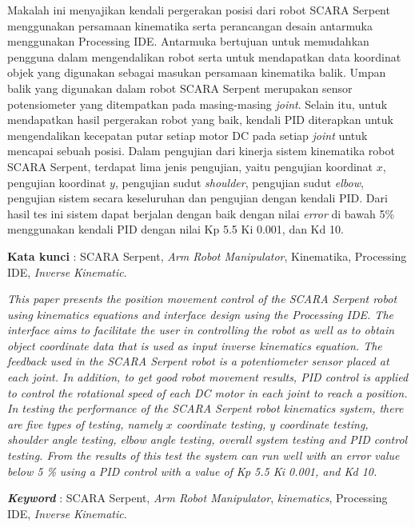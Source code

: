 \documentclass{DTEDI_KP}
\begin{document}
\tableofcontents
{}
\listoftables
{}
\listoffigures
{}

\begin{abstractind}
	Makalah ini menyajikan kendali pergerakan posisi dari robot SCARA Serpent menggunakan persamaan kinematika serta perancangan desain antarmuka menggunakan Processing IDE. Antarmuka bertujuan untuk memudahkan pengguna dalam mengendalikan robot serta untuk mendapatkan data koordinat objek yang digunakan sebagai masukan persamaan kinematika balik. Umpan balik yang digunakan dalam robot SCARA Serpent merupakan sensor potensiometer yang ditempatkan pada masing-masing \textit{joint}. Selain itu, untuk mendapatkan hasil pergerakan robot yang baik, kendali PID diterapkan untuk mengendalikan kecepatan putar setiap motor DC pada setiap \textit{joint} untuk mencapai sebuah posisi. Dalam pengujian dari kinerja sistem kinematika robot SCARA Serpent, terdapat lima jenis pengujian, yaitu pengujian koordinat $x$, pengujian koordinat $y$, pengujian sudut \textit{shoulder}, pengujian sudut \textit{elbow}, pengujian sistem secara keseluruhan dan pengujian dengan kendali PID. Dari hasil tes ini sistem dapat berjalan dengan baik dengan nilai \textit{error} di bawah 5\% menggunakan kendali PID dengan nilai Kp 5.5 Ki 0.001, dan Kd 10.
	
	
	\textbf{Kata kunci }: SCARA Serpent, \textit{Arm Robot Manipulator}, Kinematika, Processing IDE, \textit{Inverse Kinematic}.
\end{abstractind}

\begin{abstracteng}
	\textit{This paper presents the position movement control of the SCARA Serpent robot using kinematics equations and interface design using the Processing IDE. The interface aims to facilitate the user in controlling the robot as well as to obtain object coordinate data that is used as input inverse kinematics equation. The feedback used in the SCARA Serpent robot is a potentiometer sensor placed at each joint. In addition, to get good robot movement results, PID control is applied to control the rotational speed of each DC motor in each joint to reach a position. In testing the performance of the SCARA Serpent robot kinematics system, there are five types of testing, namely $x$ coordinate testing, $y$ coordinate testing, shoulder angle testing, elbow angle testing, overall system testing and PID control testing. From the results of this test the system can run well with an error value below 5 \% using a PID control with a value of Kp 5.5 Ki 0.001, and Kd 10.}
	
	
	\textit{\textbf{Keyword}} : SCARA Serpent, \textit{Arm Robot Manipulator}, \textit{kinematics}, Processing IDE, \textit{Inverse Kinematic}.
\end{abstracteng}

\newpage
\setcounter{page}{1}












\end{document}
